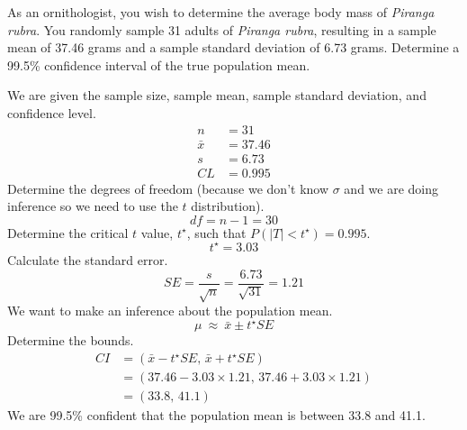 
\begin{question}
As an ornithologist, you wish to determine the average body mass of
\emph{Piranga rubra}. You randomly sample 31 adults of \emph{Piranga
rubra}, resulting in a sample mean of 37.46 grams and a sample standard
deviation of 6.73 grams. Determine a 99.5\% confidence interval of the
true population mean.
\end{question}

\begin{solution}
We are given the sample size, sample mean, sample standard deviation,
and confidence level. \[
\begin{aligned}
n &= 31 \\
\bar{x} &= 37.46 \\
s &= 6.73\\
CL &= 0.995
\end{aligned}
\] Determine the degrees of freedom (because we don't know \(\sigma\)
and we are doing inference so we need to use the \(t\) distribution).
\[df = n-1 = 30\] Determine the critical \(t\) value, \(t^\star\), such
that \(P(|T|<t^\star) = 0.995\). \[t^\star = 3.03 \] Calculate the
standard error.
\[ SE = \frac{s}{\sqrt{n}} = \frac{6.73}{\sqrt{31}} = 1.21 \] We want to
make an inference about the population mean.
\[\mu ~\approx~ \bar{x}\pm t^\star SE \] Determine the bounds. \[
\begin{aligned}
CI &= (\bar{x} - t^\star SE,\,\bar{x} + t^\star SE) \\
   &= (37.46 - 3.03\times1.21,\,37.46 + 3.03\times1.21) \\
   &= (33.8,\,41.1) 
\end{aligned}
\] We are 99.5\% confident that the population mean is between 33.8 and
41.1.
\end{solution}

